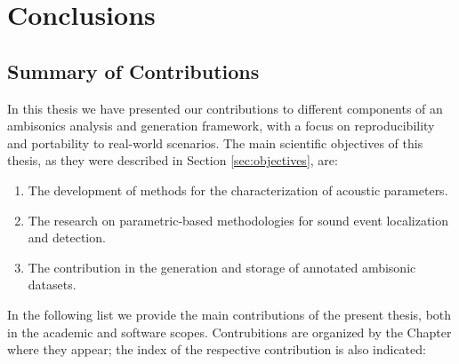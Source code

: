 \chapter{Conclusions}


\section{Summary of Contributions}

In this thesis we have presented our contributions to different components of an ambisonics analysis and generation framework, with a focus on reproducibility and portability to real-world scenarios.
The main scientific objectives of this thesis, as they were described in Section \ref{sec:objectives}, are: 
 

\begin{enumerate}
	\item The development of methods for the characterization of acoustic parameters.
	\item The research on parametric-based methodologies for sound event localization and detection.
	\item The contribution in the generation and storage of annotated ambisonic datasets.
\end{enumerate}

In the following list we provide the main contributions of the present thesis, both in the academic and software scopes. Contrubitions are organized by the Chapter where they appear; the index of the respective contribution is also indicated:
  
